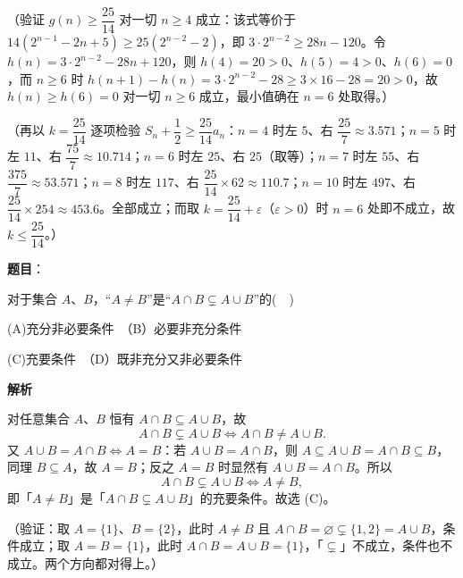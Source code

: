 \begin{answer}
（验证 \(g(n)\geqslant\dfrac{25}{14}\) 对一切 \(n\geqslant4\) 成立：该式等价于 \(14\left(2^{n-1}-2n+5\right)\geqslant25\left(2^{n-2}-2\right)\)，即 \(3\cdot2^{n-2}\geqslant28n-120\)。令 \(h(n)=3\cdot2^{n-2}-28n+120\)，则 \(h(4)=20>0\)、\(h(5)=4>0\)、\(h(6)=0\)，而 \(n\geqslant6\) 时 \(h(n+1)-h(n)=3\cdot2^{n-2}-28\geqslant3\times16-28=20>0\)，故 \(h(n)\geqslant h(6)=0\) 对一切 \(n\geqslant6\) 成立，最小值确在 \(n=6\) 处取得。）

（再以 \(k=\dfrac{25}{14}\) 逐项检验 \(S_{n}+\dfrac{1}{2}\geqslant\dfrac{25}{14}a_{n}\)：\(n=4\) 时左 \(5\)、右 \(\dfrac{25}{7}\approx3.571\)；\(n=5\) 时左 \(11\)、右 \(\dfrac{75}{7}\approx10.714\)；\(n=6\) 时左 \(25\)、右 \(25\)（取等）；\(n=7\) 时左 \(55\)、右 \(\dfrac{375}{7}\approx53.571\)；\(n=8\) 时左 \(117\)、右 \(\dfrac{25}{14}\times62\approx110.7\)；\(n=10\) 时左 \(497\)、右 \(\dfrac{25}{14}\times254\approx453.6\)。全部成立；而取 \(k=\dfrac{25}{14}+\varepsilon\)（\(\varepsilon>0\)）时 \(n=6\) 处即不成立，故 \(k\leqslant\dfrac{25}{14}\)。）



\end{answer}
\begin{answer}

\textbf{题目}：

对于集合 \(A\)、\(B\)，“\(A\neq B\)”是“\(A\cap B\subsetneq A\cup B\)”的(　)

(A)充分非必要条件　（B）必要非充分条件

(C)充要条件　（D）既非充分又非必要条件

\textbf{解析}

对任意集合 \(A\)、\(B\) 恒有 \(A\cap B\subseteq A\cup B\)，故
\nopagebreak[4]
\[
A\cap B\subsetneq A\cup B\iff A\cap B\neq A\cup B.
\]
又 \(A\cup B=A\cap B\iff A=B\)：若 \(A\cup B=A\cap B\)，则 \(A\subseteq A\cup B=A\cap B\subseteq B\)，同理 \(B\subseteq A\)，故 \(A=B\)；反之 \(A=B\) 时显然有 \(A\cup B=A\cap B\)。所以
\nopagebreak[4]
\[
A\cap B\subsetneq A\cup B\iff A\neq B,
\]
即「\(A\neq B\)」是「\(A\cap B\subsetneq A\cup B\)」的充要条件。故选 (C)。

（验证：取 \(A=\{1\}\)、\(B=\{2\}\)，此时 \(A\neq B\) 且 \(A\cap B=\varnothing\subsetneq\{1,2\}=A\cup B\)，条件成立；取 \(A=B=\{1\}\)，此时 \(A\cap B=A\cup B=\{1\}\)，「\(\subsetneq\)」不成立，条件也不成立。两个方向都对得上。）


\end{answer}
